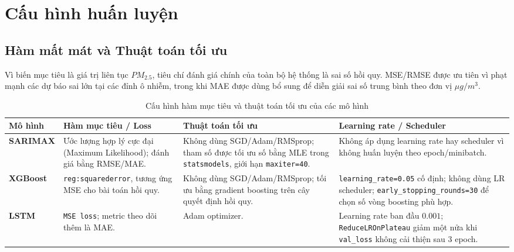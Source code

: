 \documentclass[12pt,a4paper]{article}
\begin{document}
\section{Cấu hình huấn luyện}

\subsection{Hàm mất mát và Thuật toán tối ưu}

Vì biến mục tiêu là giá trị liên tục $PM_{2.5}$, tiêu chí đánh giá chính của toàn bộ hệ thống là sai số hồi quy. MSE/RMSE được ưu tiên vì phạt mạnh các dự báo sai lớn tại các đỉnh ô nhiễm, trong khi MAE được dùng bổ sung để diễn giải sai số trung bình theo đơn vị $\mu g/m^3$.

\begin{table}[H]
    \centering
    \caption{Cấu hình hàm mục tiêu và thuật toán tối ưu của các mô hình}
    \label{tab:loss-optimizer}
    \begin{tabularx}{\textwidth}{l >{\raggedright\arraybackslash}X >{\raggedright\arraybackslash}X >{\raggedright\arraybackslash}X}
        \toprule
        \textbf{Mô hình} & \textbf{Hàm mục tiêu / Loss} & \textbf{Thuật toán tối ưu} & \textbf{Learning rate / Scheduler} \\
        \midrule
        \textbf{SARIMAX} & Ước lượng hợp lý cực đại (Maximum Likelihood); đánh giá bằng RMSE/MAE. & Không dùng SGD/Adam/RMSprop; tham số được tối ưu số bằng MLE trong \texttt{statsmodels}, giới hạn \texttt{maxiter=40}. & Không áp dụng learning rate hay scheduler vì không huấn luyện theo epoch/minibatch. \\
        \addlinespace
        \textbf{XGBoost} & \texttt{reg:squarederror}, tương ứng MSE cho bài toán hồi quy. & Không dùng SGD/Adam/RMSprop; tối ưu bằng gradient boosting trên cây quyết định hồi quy. & \texttt{learning\_rate=0.05} cố định; không dùng LR scheduler; \texttt{early\_stopping\_rounds=30} để chọn số vòng boosting phù hợp. \\
        \addlinespace
        \textbf{LSTM} & \texttt{MSE loss}; metric theo dõi thêm là MAE. & Adam optimizer. & Learning rate ban đầu $0.001$; \texttt{ReduceLROnPlateau} giảm một nửa khi \texttt{val\_loss} không cải thiện sau 3 epoch. \\
        \bottomrule
    \end{tabularx}
\end{table}
\end{document}

